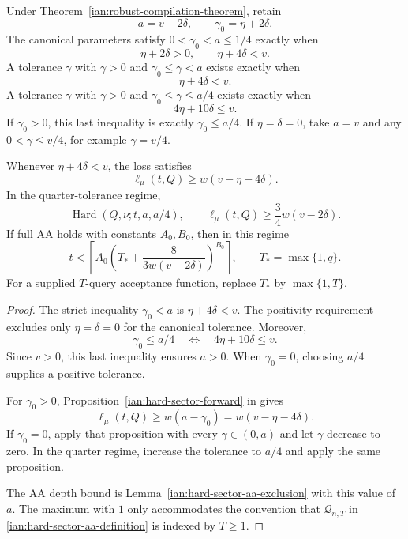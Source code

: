\begin{corollary}
\label{ian:robust-compilation-regimes}
Under Theorem~\ref{ian:robust-compilation-theorem}, retain
\[
 a=v-2\delta,\qquad \gamma_0=\eta+2\delta.
\]
The canonical parameters satisfy \(0<\gamma_0<a\le1/4\) exactly when
\[
 \eta+2\delta>0,\qquad \eta+4\delta<v.
\]
A tolerance \(\gamma\) with \(\gamma>0\) and \(\gamma_0\le\gamma<a\) exists exactly when
\[
 \eta+4\delta<v.
\]
A tolerance \(\gamma\) with \(\gamma>0\) and \(\gamma_0\le\gamma\le a/4\) exists exactly when
\[
 4\eta+10\delta\le v.
 \tag{28.3}\label{ian:robust-compilation-quarter-condition}
\]
If \(\gamma_0>0\), this last inequality is exactly \(\gamma_0\le a/4\).
If \(\eta=\delta=0\), take \(a=v\) and any \(0<\gamma\le v/4\), for example \(\gamma=v/4\).

Whenever \(\eta+4\delta<v\), the loss satisfies
\[
 \ell_\mu(t,Q)\ge w(v-\eta-4\delta).
\]
In the quarter-tolerance regime,
\[
 \operatorname{Hard}(Q,\nu;t,a,a/4),
 \qquad
 \ell_\mu(t,Q)\ge\frac34w(v-2\delta).
\]
If full AA holds with constants \(A_0,B_0\), then in this regime
\[
 t<
 \left\lceil
 A_0\left(T_*+\frac{8}{3w(v-2\delta)}\right)^{B_0}
 \right\rceil,
 \qquad T_*=\max\{1,q\}.
\]
For a supplied \(T\)-query acceptance function, replace \(T_*\) by \(\max\{1,T\}\).
\end{corollary}

\begin{proof}
The strict inequality \(\gamma_0<a\) is
\(\eta+4\delta<v\).
The positivity requirement excludes only \(\eta=\delta=0\) for the canonical tolerance.
Moreover,
\[
 \gamma_0\le a/4
 \quad\Longleftrightarrow\quad
 4\eta+10\delta\le v.
\]
Since \(v>0\), this last inequality ensures \(a>0\).
When \(\gamma_0=0\), choosing \(a/4\) supplies a positive tolerance.

For \(\gamma_0>0\), Proposition~\ref{ian:hard-sector-forward} in
 gives
\[
 \ell_\mu(t,Q)
 \ge w(a-\gamma_0)
 =w(v-\eta-4\delta).
\]
If \(\gamma_0=0\), apply that proposition with every \(\gamma\in(0,a)\) and let \(\gamma\) decrease to zero.
In the quarter regime, increase the tolerance to \(a/4\) and apply the same proposition.

The AA depth bound is Lemma~\ref{ian:hard-sector-aa-exclusion} with this value of \(a\).
The maximum with \(1\) only accommodates the convention that
\(\mathcal Q_{n,T}\) in \eqref{ian:hard-sector-aa-definition} is indexed by \(T\ge1\).
\end{proof}

